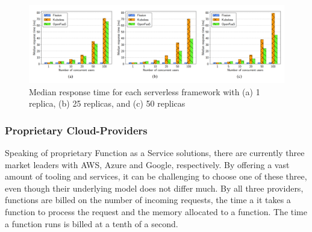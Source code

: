 \documentclass[a4paper,twoside,11pt, pagesize]{scrartcl}
\begin{document}
\begin{spacing}{1.2}
\begin{figure}[H]
\label{fig:opensource}
\centering
\includegraphics[width=1\textwidth]{opensource}
\caption{Median response time for each serverless framework with (a) 1 replica, (b) 25 replicas, and (c) 50 replicas \cite{mohanty2018evaluation}}
\end{figure}
\subsubsection{Proprietary Cloud-Providers}
Speaking of proprietary Function as a Service solutions, there are currently three market leaders \cite{kumar2019serverless} with AWS, Azure and Google, respectively. By offering a vast amount of tooling and services, it can be challenging to choose one of these three, even though their underlying model does not differ much. By all three providers, functions are billed on the number of incoming requests, the time a it takes a function to process the request and the memory allocated to a function. The time a function runs is billed at a tenth of a second. 

\end{spacing}
\end{document}
